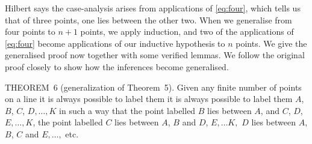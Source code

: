 Hilbert says the case-analysis arises from applications of \ref{eq:four}, which tells us that of three points, one lies between the other two. When we generalise from four points to $n+1$ points, we apply induction, and two of the applications of \ref{eq:four} become applications of our inductive hypothesis to $n$ points. We give the generalised proof now together with some verified lemmas. We follow the original proof closely to show how the inferences become generalised.

\begin{proposition}\label{eq:PlaneThree}
THEOREM~6 (generalization of Theorem~5). Given any finite number of points on a line it is always possible to label them it is always possible to label them $A$, $B$, $C$, $D, \ldots, K$ in such a way that the point labelled $B$ lies between $A$, and $C$, $D$, $E, \ldots, K$, the point labelled $C$ lies between $A$, $B$ and $D$, $E,\ldots K,$ $D$ lies between $A$, $B$, $C$ and $E, \ldots,$ etc.
\end{proposition}
